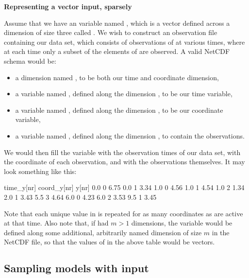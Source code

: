 \begin{example}
\noindent \textbf{Representing a vector input, sparsely}

Assume that we have an  variable named , which is a vector
defined across a dimension of size three called . We wish to construct
an observation file containing our data set, which consists of observations of
 at various times, where at each time only a subset of the elements of
 are observed. A valid NetCDF schema would be:
\begin{itemize}
\item a dimension named , to be both our time and coordinate
  dimension,
\item a variable named , defined along the dimension ,
  to be our time variable,
\item a variable named , defined along the dimension ,
  to be our coordinate variable,
\item a variable named , defined along the dimension , to
  contain the observations.
\end{itemize}
We would then fill the variable  with the observation times of
our data set,  with the coordinate of each observation, and
 with the observations themselves. It may look something like this:

\begin{cmdcode}
time_y[nr]   coord_y[nr]      y[nr]
       0.0             0       6.75
       0.0             1       3.34
       1.0             0       4.56
       1.0             1       4.54
       1.0             2       1.34
       2.0             1       3.43
       5.5             3       4.64
       6.0             0       4.23
       6.0             2       3.53
       9.5             1       3.45
\end{cmdcode}

Note that each unique value in  is repeated for as many
coordinates as are active at that time. Also note that, if  had $m >
1$ dimensions, the  variable would be defined along some
additional, arbitrarily named dimension of size $m$ in the NetCDF file, so
that the values of  in the above table would be vectors.
\end{example}

\subsection{Sampling models with input\label{Sampling_models_with_input}}

